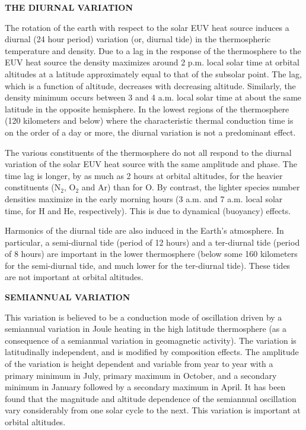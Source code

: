 \textbf{THE DIURNAL VARIATION}

The rotation of the earth with respect to the solar EUV heat source induces
a diurnal (24 hour period) variation (or, diurnal tide) in the thermospheric
temperature and density. Due to a lag in the response of the thermosphere to
the EUV heat source the density maximizes around 2 p.m. local solar time at
orbital altitudes at a latitude approximately equal to that of the subsolar
point.  The lag, which is a function of altitude, decreases with decreasing
altitude. Similarly, the density minimum occurs between 3 and 4 a.m. local
solar time at about the same latitude in the opposite hemisphere.  In the
lowest regions of the thermosphere (120 kilometers and below) where the
characteristic thermal conduction time is on the order of a day or more, the
diurnal variation is not a predominant effect.

The various constituents of the thermosphere do not all respond to the
diurnal variation of the solar EUV heat source with the same amplitude and
phase.  The time lag is longer, by as much as 2 hours at orbital altitudes,
for the heavier constituents (N$_{2}$, O$_{2}$ and Ar) than for O.  By contrast, the
lighter species number densities maximize in the early morning hours (3 a.m.
and 7 a.m. local solar time, for H and He, respectively). This is due to
dynamical (buoyancy) effects.

Harmonics of the diurnal tide are also induced in the Earth's atmosphere. In
particular, a semi-diurnal tide (period of 12 hours) and a ter-diurnal
tide (period of 8 hours) are important in the lower thermosphere (below some
160 kilometers for the semi-diurnal tide, and much lower for the
ter-diurnal tide).  These tides are not important at orbital altitudes.

\textbf{SEMIANNUAL VARIATION}

This variation is believed to be a conduction mode of oscillation driven by
a semiannual variation in Joule heating in the high latitude thermosphere
(as a consequence of a semiannual variation in geomagnetic activity).  The
variation is latitudinally independent, and is modified by composition
effects.  The amplitude of the variation is height dependent and variable
from year to year with a primary minimum in July, primary maximum in
October, and a secondary minimum in January followed by a secondary maximum
in April.  It has been found that the magnitude and altitude dependence of
the semiannual oscillation vary considerably from one solar cycle to the
next.  This variation is important at orbital altitudes.

